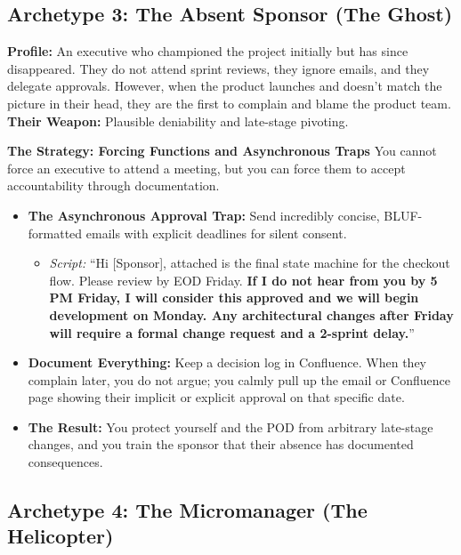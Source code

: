 \documentclass[
  11pt,
  openany,
  oneside]{book}
\providecommand{\tightlist}{%
  \setlength{\itemsep}{0pt}\setlength{\parskip}{0pt}}
\begin{document}
\subsection{Archetype 3: The Absent Sponsor (The
Ghost)}\label{archetype-3-the-absent-sponsor-the-ghost}

\textbf{Profile:} An executive who championed the project initially but
has since disappeared. They do not attend sprint reviews, they ignore
emails, and they delegate approvals. However, when the product launches
and doesn't match the picture in their head, they are the first to
complain and blame the product team. \textbf{Their Weapon:} Plausible
deniability and late-stage pivoting.

\textbf{The Strategy: Forcing Functions and Asynchronous Traps} You
cannot force an executive to attend a meeting, but you can force them to
accept accountability through documentation.

\begin{itemize}
\tightlist
\item
  \textbf{The Asynchronous Approval Trap:} Send incredibly concise,
  BLUF-formatted emails with explicit deadlines for silent consent.

  \begin{itemize}
  \tightlist
  \item
    \emph{Script:} ``Hi {[}Sponsor{]}, attached is the final state
    machine for the checkout flow. Please review by EOD Friday.
    \textbf{If I do not hear from you by 5 PM Friday, I will consider
    this approved and we will begin development on Monday. Any
    architectural changes after Friday will require a formal change
    request and a 2-sprint delay.}''
  \end{itemize}
\item
  \textbf{Document Everything:} Keep a decision log in Confluence. When
  they complain later, you do not argue; you calmly pull up the email or
  Confluence page showing their implicit or explicit approval on that
  specific date.
\item
  \textbf{The Result:} You protect yourself and the POD from arbitrary
  late-stage changes, and you train the sponsor that their absence has
  documented consequences.
\end{itemize}

\subsection{Archetype 4: The Micromanager (The
Helicopter)}\label{archetype-4-the-micromanager-the-helicopter}
\end{document}
